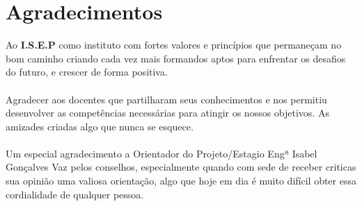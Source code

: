\label{Agradecimentos}
\cleardoublepage
\section*{Agradecimentos}
Ao \textbf{I.S.E.P} como instituto com fortes valores e princípios que permaneçam no bom caminho criando cada vez mais formandos aptos para enfrentar os desafios do futuro, e crescer de forma positiva.\\
\\
Agradecer aos docentes que partilharam seus conhecimentos e nos permitiu desenvolver as competências necessárias para atingir os nossos objetivos. As amizades criadas algo que nunca se esquece.\\
\\
Um especial agradecimento a Orientador do Projeto/Estagio Engª Isabel Gonçalves Vaz pelos conselhos, especialmente quando com sede de receber criticas sua opinião uma valiosa orientação, algo que hoje em dia é muito difícil obter essa cordialidade de qualquer pessoa.
